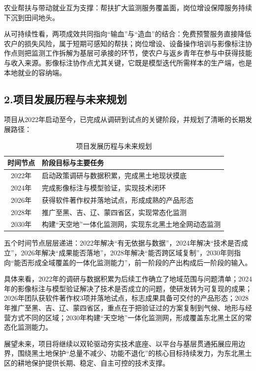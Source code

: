农业帮扶与带动就业互为支撑：帮扶扩大监测服务覆盖面，岗位增设保障服务持续下沉到田间地头。

从可持续性看，两项成效共同指向“输血”与“造血”的结合：免费预警服务直接降低农户的损失风险，属于短期可感知的帮扶；岗位增设、设备操作培训与影像标注协作点则把监测工作拆解为基层可承接的环节，使农户与返乡青年在参与中获得技能与收入来源。影像标注协作点尤其关键，它既是模型迭代所需样本的生产端，也是本地就业的容纳端。

\subsection{2.项目发展历程与未来规划}

项目从2022年启动至今，已完成从调研到试点的关键阶段，并规划了清晰的长期发展路径：

\begin{table}[htbp]
  \centering
  \caption{项目发展历程与未来规划}
  \begin{tabular}{|c|p{}|}
  \hline
  时间节点 & 阶段目标与主要任务 \\
  \hline
  2022年 & 启动政策调研与数据积累，完成黑土地现状摸底 \\
  \hline
  2024年 & 完成影像标注与模型验证，实现技术闭环 \\
  \hline
  2026年 & 获得软件著作权并落地试点，形成成熟的产品形态 \\
  \hline
  2028年 & 推广至黑、吉、辽、蒙四省区，实现常态化监测 \\
  \hline
  2030年 & 构建“天空地”一体化监测网，实现东北黑土地全网动态监测 \\
  \hline
  \end{tabular}
  \label{tab:plan}
\end{table}

五个时间节点层层递进：2022年解决“有无依据与数据”，2024年解决“技术是否成立”，2026年解决“成果能否落地”，2028年解决“能否跨区域复制”，2030年则指向“能否形成全域覆盖的一体化监测能力”，前一阶段的产出构成后一阶段的输入。

具体来看，2022年的调研与数据积累为后续工作确立了地域范围与问题清单；2024年的影像标注与模型验证解决了技术是否成立的问题，使研发转为可复现的成果；2026年团队获软件著作权3项并落地试点，标志成果具备可交付的产品形态；2028年推广至黑、吉、辽、蒙四省区，重点在于把验证过的方案复制到气候、地形与经营方式不同的区域；2030年构建“天空地”一体化监测网，形成覆盖东北黑土区的常态化监测能力。

展望未来，项目将继续以双轮驱动夯实技术底座、以平台与基层贯通拓展应用边界，围绕黑土地保护“总量不减少、功能不退化”的核心目标持续发力，为东北黑土区的耕地保护提供长期、稳定、自主可控的技术支撑。
